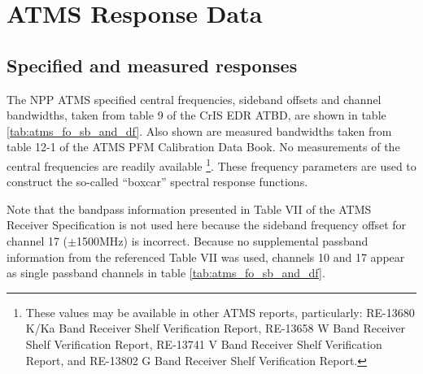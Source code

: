 \section{ATMS Response Data}

\subsection{Specified and measured responses}
The NPP ATMS specified central frequencies, sideband offsets and channel bandwidths, taken from table 9 of the CrIS EDR ATBD\cite{CrIS_EDR_ATBD}, are shown in table \ref{tab:atms_fo_sb_and_df}. Also shown are measured bandwidths taken from table 12-1 of the ATMS PFM Calibration Data Book\cite{ATMS_PFM_CalLog}. No measurements of the central frequencies are readily available \footnote{These values may be available in other ATMS reports, particularly: RE-13680 K/Ka Band Receiver Shelf Verification Report, RE-13658 W Band Receiver Shelf Verification Report, RE-13741 V Band Receiver Shelf Verification Report, and RE-13802 G Band Receiver Shelf Verification Report.}. These frequency parameters are used to construct the so-called ``boxcar'' spectral response functions. 

Note that the bandpass information presented in Table VII of the ATMS Receiver Specification\cite{ATMS_Receiver_Spec} is not used here because the sideband frequency offset for channel 17 ($\pm$1500MHz) is incorrect. Because no supplemental passband information from the referenced Table VII\cite{ATMS_Receiver_Spec} was used, channels 10 and 17 appear as single passband channels in table \ref{tab:atms_fo_sb_and_df}.

